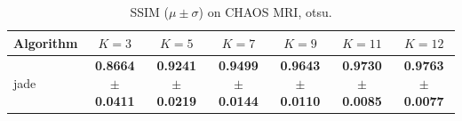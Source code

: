 \begin{table}[htbp]
\centering
\caption{SSIM ($\mu \pm \sigma$) on CHAOS MRI, otsu.}
\label{tab:exp2-otsu-ssim}
\begin{tabular}{lcccccc}
\toprule
Algorithm & $K=3$ & $K=5$ & $K=7$ & $K=9$ & $K=11$ & $K=12$ \\
\midrule
jade & \textbf{0.8664 $\pm$ 0.0411} & \textbf{0.9241 $\pm$ 0.0219} & \textbf{0.9499 $\pm$ 0.0144} & \textbf{0.9643 $\pm$ 0.0110} & \textbf{0.9730 $\pm$ 0.0085} & \textbf{0.9763 $\pm$ 0.0077} \\
\bottomrule
\end{tabular}
\end{table}